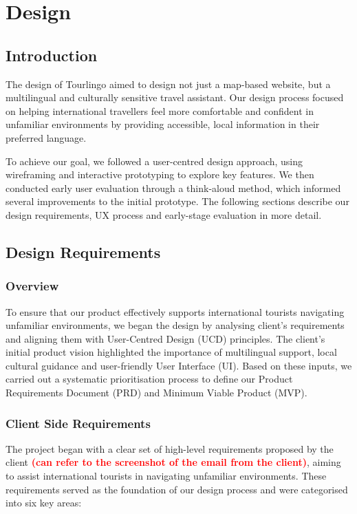 \chapter{Design}

\section{Introduction}

The design of Tourlingo aimed to design not just a map-based website, but a multilingual and culturally sensitive travel assistant. Our design process focused on helping international travellers feel more comfortable and confident in unfamiliar environments by providing accessible, local information in their preferred language.

To achieve our goal, we followed a user-centred design approach, using wireframing and interactive prototyping to explore key features. We then conducted early user evaluation through a think-aloud method, which informed several improvements to the initial prototype. The following sections describe our design requirements, UX process and early-stage evaluation in more detail.

\section{Design Requirements}

\subsection{Overview}
To ensure that our product effectively supports international tourists navigating unfamiliar environments, we began the design by analysing client's requirements and aligning them with User-Centred Design (UCD) principles. The client's initial product vision highlighted the importance of multilingual support, local cultural guidance and user-friendly User Interface (UI). Based on these inputs, we carried out a systematic prioritisation process to define our Product Requirements Document (PRD) and Minimum Viable Product (MVP).

\subsection{Client Side Requirements}
The project began with a clear set of high-level requirements proposed by the client \textbf{\textcolor{red}{(can refer to the screenshot of the email from the client)}}, aiming to assist international tourists in navigating unfamiliar environments. These requirements served as the foundation of our design process and were categorised into six key areas:

